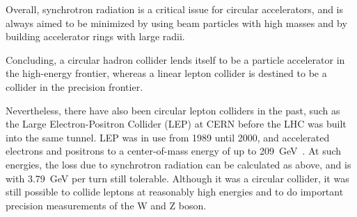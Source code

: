 Overall, synchrotron radiation is a critical issue for circular accelerators, and is always aimed to be minimized by using beam particles with high masses and by building accelerator rings with large radii.

Concluding, a circular hadron collider lends itself to be a particle accelerator in the high-energy frontier, whereas a linear lepton collider is destined to be a collider in the precision frontier.

Nevertheless, there have also been circular lepton colliders in the past, such as the Large Electron-Positron Collider (LEP) at CERN before the LHC was built into the same tunnel.
LEP was in use from 1989 until 2000, and accelerated electrons and positrons to a center-of-mass energy of up to \SI{209}{\GeV}~\cite{LEP}.
At such energies, the loss due to synchrotron radiation can be calculated as above, and is with \SI{3.79}{\GeV} per turn still tolerable.
Although it was a circular collider, it was still possible to collide leptons at reasonably high energies and to do important precision measurements of the W and Z boson.

